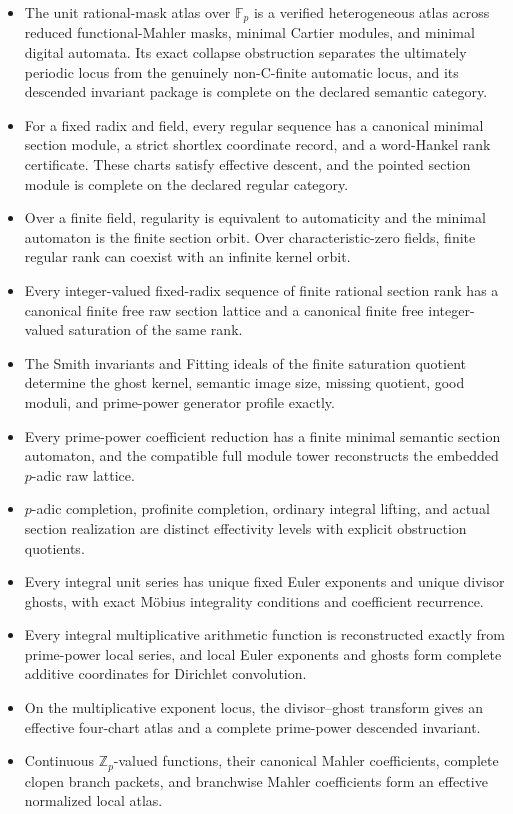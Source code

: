 \begin{itemize}
\item The unit rational-mask atlas over \(\mathbb F_p\) is a verified heterogeneous atlas across reduced functional-Mahler masks, minimal Cartier modules, and minimal digital automata. Its exact collapse obstruction separates the ultimately periodic locus from the genuinely non-C-finite automatic locus, and its descended invariant package is complete on the declared semantic category.
\item For a fixed radix and field, every regular sequence has a canonical minimal section module, a strict shortlex coordinate record, and a word-Hankel rank certificate. These charts satisfy effective descent, and the pointed section module is complete on the declared regular category.
\item Over a finite field, regularity is equivalent to automaticity and the minimal automaton is the finite section orbit. Over characteristic-zero fields, finite regular rank can coexist with an infinite kernel orbit.
\item Every integer-valued fixed-radix sequence of finite rational section rank has a canonical finite free raw section lattice and a canonical finite free integer-valued saturation of the same rank.
\item The Smith invariants and Fitting ideals of the finite saturation quotient determine the ghost kernel, semantic image size, missing quotient, good moduli, and prime-power generator profile exactly.
\item Every prime-power coefficient reduction has a finite minimal semantic section automaton, and the compatible full module tower reconstructs the embedded \(p\)-adic raw lattice.
\item \(p\)-adic completion, profinite completion, ordinary integral lifting, and actual section realization are distinct effectivity levels with explicit obstruction quotients.
\item Every integral unit series has unique fixed Euler exponents and unique divisor ghosts, with exact M\"obius integrality conditions and coefficient recurrence.
\item Every integral multiplicative arithmetic function is reconstructed exactly from prime-power local series, and local Euler exponents and ghosts form complete additive coordinates for Dirichlet convolution.
\item On the multiplicative exponent locus, the divisor--ghost transform gives an effective four-chart atlas and a complete prime-power descended invariant.
\item Continuous \(\mathbb Z_p\)-valued functions, their canonical Mahler coefficients, complete clopen branch packets, and branchwise Mahler coefficients form an effective normalized local atlas.

\end{itemize}

